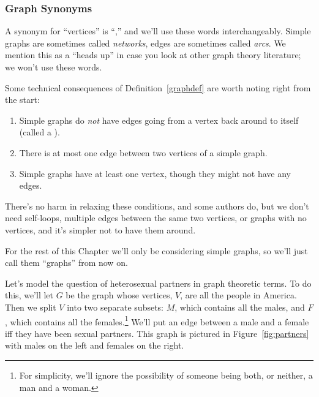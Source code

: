 \subsubsection{Graph Synonyms}
A synonym for ``vertices'' is ``,'' and we'll use these words
interchangeably.  Simple graphs are sometimes called \emph{networks}, edges are sometimes
called \emph{arcs}.  We mention this as a ``heads up'' in case you look at
other graph theory literature; we won't use these words.

Some technical consequences of Definition~\ref{graphdef} are worth noting
right from the start:
\begin{enumerate}
\item Simple graphs do \emph{not} have edges going from a vertex back
  around to itself (called a ).

\item There is at most one edge between two vertices of a simple graph.

\item Simple graphs have at least one vertex, though they might not have
any edges.
\end{enumerate}
There's no harm in relaxing these conditions, and some authors do, but we
don't need self-loops, multiple edges between the same two vertices, or
graphs with no vertices, and it's simpler not to have them around.

For the rest of this Chapter we'll only be considering simple graphs, so
we'll just call them ``graphs'' from now on.


Let's model the question of heterosexual partners in graph theoretic
terms.  To do this, we'll let $G$ be the graph whose vertices, $V$, are
all the people in America.  Then we split $V$ into two separate subsets:
$M$, which contains all the males, and $F$, which contains all the
females.\footnote{For simplicity, we'll ignore the possibility of someone
  being both, or neither, a man and a woman.}  We'll put an edge between a
male and a female iff they have been sexual partners.  This graph is
pictured in Figure~\ref{fig:partners} with males on the left and females on
the right.

